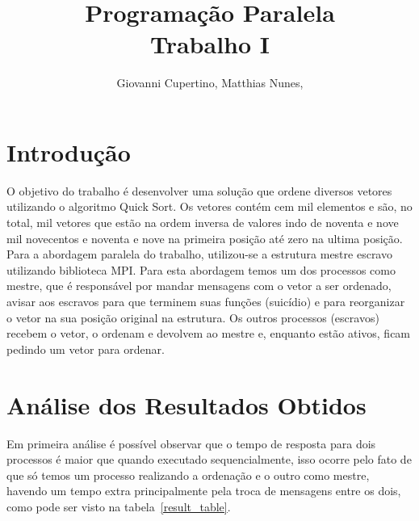 \documentclass[11pt]{IEEEtran}
\title{Programação Paralela\\ Trabalho I}
\author{Giovanni Cupertino, Matthias Nunes, \IEEEmembership{Usuário pp12820}}
\begin{document}
\maketitle

\section{Introdução}

	O objetivo do trabalho é desenvolver uma solução que ordene diversos vetores
	utilizando o algoritmo Quick Sort.  Os vetores contém cem mil elementos e
	são, no total, mil vetores que estão na ordem inversa de valores indo de
	noventa e nove mil novecentos e noventa e nove na primeira posição até zero
	na ultima posição.  Para a abordagem paralela do trabalho, utilizou-se a
	estrutura mestre escravo utilizando biblioteca MPI\@. Para esta abordagem
	temos um dos processos como mestre, que é responsável por mandar mensagens
	com o vetor a ser ordenado, avisar aos escravos para que terminem suas
	funções (suicídio) e para reorganizar o vetor na sua posição original na
	estrutura. Os outros processos (escravos) recebem o vetor, o ordenam e
	devolvem ao mestre e, enquanto estão ativos, ficam pedindo um vetor para
	ordenar.

\section{Análise dos Resultados Obtidos}

	Em primeira análise é possível observar que o tempo de resposta para dois
	processos é maior que quando executado sequencialmente, isso ocorre pelo
	fato de que só temos um processo realizando a ordenação e o outro como
	mestre, havendo um tempo extra principalmente pela troca de mensagens entre
	os dois, como pode ser visto na tabela~\ref{result_table}.
\end{document}
